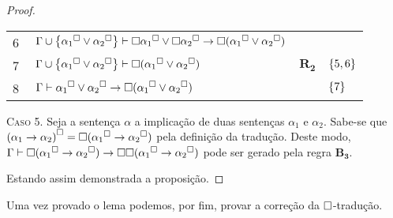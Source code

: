 \begin{tcolorbox}[enhanced jigsaw, breakable, sharp corners, colframe=black, colback=white, boxrule=0.5pt, left=1.5mm, right=1.5mm, top=1.5mm, bottom=1.5mm]
\begin{theorem}[Estabilidade]
\begin{proof}
\begin{xltabular}{\textwidth}{r | X l l}
                \scriptsize{\phantom{1}6}\phantom{ } & $\ \Gamma\cup\set{{\alpha_1}^\medsquare\vee{\alpha_2}^\medsquare}\entails\nec{\alpha_1}^\medsquare\vee\nec{\alpha_2}^\medsquare\to\nec({\alpha_1}^\medsquare\vee{\alpha_2}^\medsquare)$     &  &\\[\rowskip]
                \scriptsize{\phantom{1}7}\phantom{ } & $\ \Gamma\cup\set{{\alpha_1}^\medsquare\vee{\alpha_2}^\medsquare}\entails\nec({\alpha_1}^\medsquare\vee{\alpha_2}^\medsquare)$                                                              & $\hyperref[modal.rule.2]{\mathbf{R_2}}$         & $\left\{5,6\right\}$\\[\rowskip]
                \scriptsize{\phantom{1}8}\phantom{ } & $\ \Gamma\entails{\alpha_1}^\medsquare\vee{\alpha_2}^\medsquare\to\nec({\alpha_1}^\medsquare\vee{\alpha_2}^\medsquare)$                                                                     &  & $\left\{7\right\}$
            \end{xltabular}
            \normalsize

            \vspace{.5\baselineskip}
            \textsc{Caso 5.}
            Seja a sentença $\alpha$ a implicação de duas sentenças $\alpha_1$ e $\alpha_2$.
            Sabe-se que ${(\alpha_1\to\alpha_2)}^\Box=\Box({\alpha_1}^\Box\to{\alpha_2}^\Box)$ pela definição da tradução.
            Deste modo, $\Gamma\vdash\Box({\alpha_1}^\Box\to{\alpha_2}^\Box)\to\Box\Box({\alpha_1}^\Box\to{\alpha_2}^\Box)$ pode ser gerado pela regra \hyperref[modal.axiom.modal.3]{$\mathbf{B_3}$}.

            \vspace{.5\baselineskip}
            Estando assim demonstrada a proposição.
        \end{proof}
    \end{theorem}
    \end{tcolorbox}

    Uma vez provado o lema podemos, por fim, provar a correção da $\Box$-tradução.

